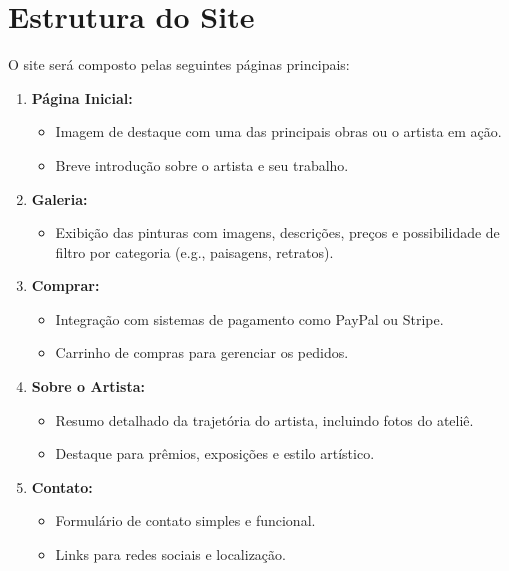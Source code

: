 \documentclass[a4paper,12pt]{article}
\begin{document}
\section*{Estrutura do Site}
O site será composto pelas seguintes páginas principais:
\begin{enumerate}
    \item \textbf{Página Inicial:}
    \begin{itemize}
        \item Imagem de destaque com uma das principais obras ou o artista em ação.
        \item Breve introdução sobre o artista e seu trabalho.
    \end{itemize}
    \item \textbf{Galeria:}
    \begin{itemize}
        \item Exibição das pinturas com imagens, descrições, preços e possibilidade de filtro por categoria (e.g., paisagens, retratos).
    \end{itemize}
    \item \textbf{Comprar:}
    \begin{itemize}
        \item Integração com sistemas de pagamento como PayPal ou Stripe.
        \item Carrinho de compras para gerenciar os pedidos.
    \end{itemize}
    \item \textbf{Sobre o Artista:}
    \begin{itemize}
        \item Resumo detalhado da trajetória do artista, incluindo fotos do ateliê.
        \item Destaque para prêmios, exposições e estilo artístico.
    \end{itemize}
    \item \textbf{Contato:}
    \begin{itemize}
        \item Formulário de contato simples e funcional.
        \item Links para redes sociais e localização.
    \end{itemize}
\end{enumerate}
\end{document}
